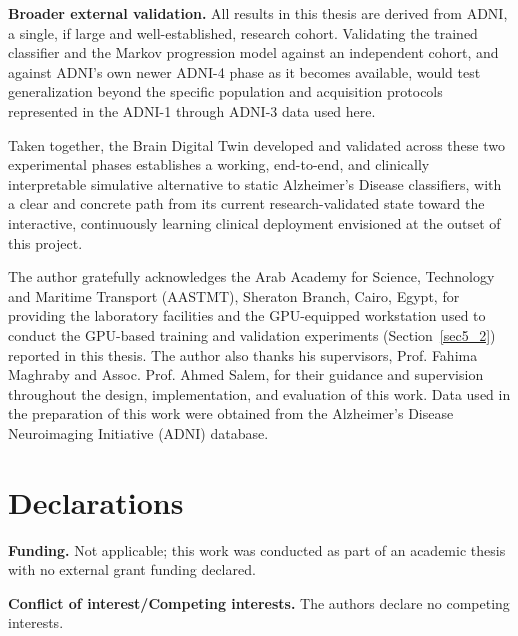 \documentclass[pdflatex,sn-mathphys-num]{sn-jnl}%
\theoremstyle{thmstyleone}%
\theoremstyle{thmstyletwo}%
\theoremstyle{thmstylethree}%
\begin{document}
\textbf{Broader external validation.} All results in this thesis are derived from ADNI, a single, if large and well-established, research cohort. Validating the trained classifier and the Markov progression model against an independent cohort, and against ADNI's own newer ADNI-4 phase as it becomes available, would test generalization beyond the specific population and acquisition protocols represented in the ADNI-1 through ADNI-3 data used here.

Taken together, the Brain Digital Twin developed and validated across these two experimental phases establishes a working, end-to-end, and clinically interpretable simulative alternative to static Alzheimer's Disease classifiers, with a clear and concrete path from its current research-validated state toward the interactive, continuously learning clinical deployment envisioned at the outset of this project.

\backmatter


The author gratefully acknowledges the Arab Academy for Science, Technology and Maritime Transport (AASTMT), Sheraton Branch, Cairo, Egypt, for providing the laboratory facilities and the GPU-equipped workstation used to conduct the GPU-based training and validation experiments (Section~\ref{sec5_2}) reported in this thesis. The author also thanks his supervisors, Prof. Fahima Maghraby and Assoc. Prof. Ahmed Salem, for their guidance and supervision throughout the design, implementation, and evaluation of this work. Data used in the preparation of this work were obtained from the Alzheimer's Disease Neuroimaging Initiative (ADNI) database.

\section*{Declarations}


\noindent\textbf{Funding.} Not applicable; this work was conducted as part of an academic thesis with no external grant funding declared.

\noindent\textbf{Conflict of interest/Competing interests.} The authors declare no competing interests.
\end{document}
